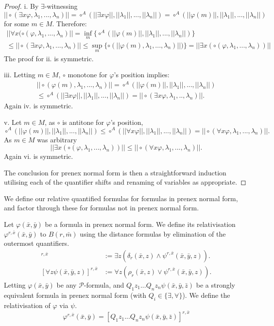 \documentclass{lmcs} %
\newcommand{\?}{\ensuremath{\mkern0.4\thinmuskip}}
\let\phi=\varphi
\newcommand{\CP}{\mathcal{P}}
\begin{document}
\begin{proof}
    i. By $\exists$-witnessing \[||\circ(\exists x\phi,\lambda_1,...,\lambda_n)||=\circ^A(||\exists x\phi||,||\lambda_1||,...,||\lambda_n||)=\circ^A(||\phi(m)||,||\lambda_1||,...,||\lambda_n||)\] 
    for some $m\in M$. Therefore:\begin{multline*}
    ||\forall x(\circ(\phi,\lambda_1,...,\lambda_n)||=\inf_{m}\{\circ^A(||\phi(m)||,||\lambda_1||,...,||\lambda_n||)\}\\
    \leq ||\circ(\exists x\phi,\lambda_1,...,\lambda_n)||\leq \sup_{m}\{\circ(||\phi(m),\lambda_1,...,\lambda_n)||)\}=||\exists x(\circ(\phi,\lambda_1,...,\lambda_n))||
    \end{multline*} 
    The proof for ii. is symmetric. 

    iii. Letting $m\in M$, $\circ$ monotone for $\phi$'s position implies:\begin{multline*}
    ||\circ(\phi(m),\lambda_1,...,\lambda_n)||=\circ^A(||\phi(m)||,||\lambda_1||,...,||\lambda_n||)\\\leq \circ^A(||\exists x\phi||,||\lambda_1||,...,||\lambda_n||)=||\circ(\exists x\phi,\lambda_1,..,\lambda_n)||.
    \end{multline*}
    Again iv. is symmetric. 

    v. Let $m\in M$, as $\circ$ is antitone for $\phi$'s position, \[\circ^A(||\phi(m)||,||\lambda_1||,...,||\lambda_n||)\leq \circ^A(||\forall x\phi||,||\lambda_1||,...,||\lambda_n||)=||\circ(\forall x\phi,\lambda_1,...,\lambda_n)||.\]
    As $m\in M$ was arbitrary \[||\exists x(\circ(\phi,\lambda_1,...,\lambda_n))||\leq ||\circ(\forall x\phi,\lambda_1,...,\lambda_n)||.\] 
    Again vi. is symmetric. 

    The conclusion for prenex normal form is then a straightforward induction utilising each of the quantifier shifts and renaming of variables as appropriate.
\end{proof}

We define our relative quantified formulas for formulas in prenex normal form, and factor through these for formulas not in prenex normal form.
\begin{defi}
    Let $\phi(\bar{x},\bar{y})$ be a formula in prenex normal form. We define its relativisation $\phi^{r,\bar{x}}(\bar{x},\bar{y})$ to $B(r,\bar{m})$ using the distance formulas by elimination of the outermost quantifiers.  
    \begin{align*}
        [\exists z\psi(\bar{x},\bar{y},z)]^{r,\bar{x}}&:= \exists z(\delta_r(\bar{x},z)\land \psi^{r,\bar{x}}(\bar{x},\bar{y},z)). \\
        [\forall z\psi(\bar{x},\bar{y},z)]^{r,\bar{x}}&:= \forall z(\rho_r(\bar{x},z)\lor \psi^{r,\bar{x}}(\bar{x},\bar{y},z)).
    \end{align*}
    Letting $\phi(\bar{x},\bar{y})$ be any $\CP$-formula, and $Q_1z_1...Q_nz_n\psi(\bar{x},\bar{y},\bar{z})$ be a strongly equivalent formula in prenex normal form (with $Q_i\in\{\exists,\forall\}$). We define the relativisation of $\phi$ via $\psi$.
    \[\phi^{r,\bar{x}}(\bar{x},\bar{y})=[Q_1z_1...Q_nz_n\psi(\bar{x},\bar{y},\bar{z})]^{r,\bar{x}}\] 
\end{defi}
\end{document}
